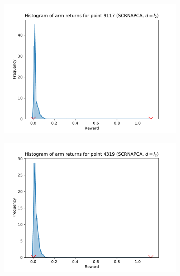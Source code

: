 \begin{figure}[ht]
\begin{subfigure}{.5\textwidth}
  \centering
  \includegraphics[width=\linewidth]{figures/sigma-SCRNAPCA-0-L2.pdf}  
\end{subfigure}
\begin{subfigure}{.5\textwidth}
  \centering
  \includegraphics[width=\linewidth]{figures/sigma-SCRNAPCA-1-L2.pdf}   
\end{subfigure}
\begin{subfigure}{.5\textwidth}
  \centering

\end{subfigure}
\end{figure}
